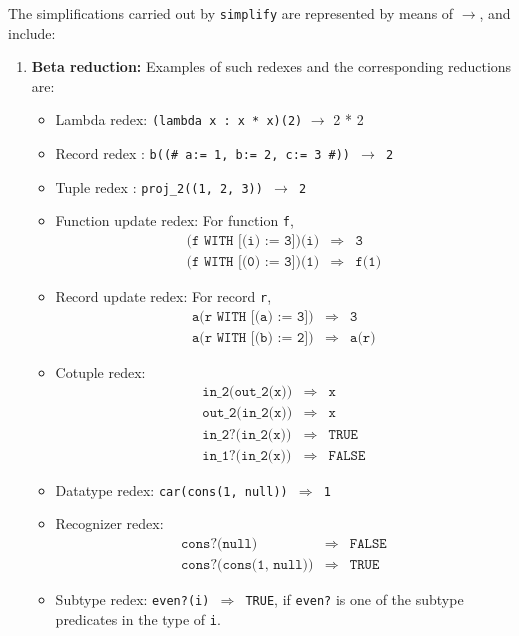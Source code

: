 \documentclass[12pt,twoside]{book}
\makeatletter
\newcommand{\indtt}[1]{\texttt{#1}\index{#1@{\texttt{#1}}}}  %
\makeatother
\begin{document}
\begin{description}
The simplifications carried out by \indtt{simplify} are represented
by means of $\longrightarrow$, and  include:
\begin{enumerate}
\item {\bf Beta reduction:}  Examples of such redexes and the
corresponding reductions are:
\begin{itemize}
\item Lambda redex: \texttt{(lambda x : x * x)(2)} $\longrightarrow$ 2 * 2
\item Record redex : \texttt{b((\# a:= 1, b:= 2, c:= 3 \#)) $\longrightarrow$
2}
\item Tuple redex :   \texttt{proj\_2((1, 2, 3))  $\longrightarrow$ 2}
\item Function update redex: For function \texttt{f},
\begin{eqnarray*}
 \texttt{(f\ WITH\ [(i) := 3])(i)} &\Longrightarrow & \texttt{3}\\
   \texttt{(f\ WITH\ [(0) := 3])(1)} &\Longrightarrow & \texttt{f(1)}
\end{eqnarray*}
\item Record update redex: For record \texttt{r},
\begin{eqnarray*}
\texttt{a(r\ WITH\ [(a) := 3])}  & \Longrightarrow& \texttt{3}\\
\texttt{a(r\ WITH\ [(b) := 2])} & \Longrightarrow & \texttt{a(r)}
\end{eqnarray*}
\item Cotuple redex:
\begin{eqnarray*}
\texttt{in\_2(out\_2(x))} & \Longrightarrow & \texttt{x}\\
\texttt{out\_2(in\_2(x))} & \Longrightarrow & \texttt{x}\\
\texttt{in\_2?(in\_2(x))} & \Longrightarrow & \texttt{TRUE}\\
\texttt{in\_1?(in\_2(x))} & \Longrightarrow & \texttt{FALSE}
\end{eqnarray*}
\item Datatype redex: \texttt{car(cons(1, null)) $\Longrightarrow$ 1}
\item Recognizer redex:
\begin{eqnarray*}
\texttt{cons?(null)} & \Longrightarrow & \texttt{FALSE}\\
\texttt{cons?(cons(1, null))} & \Longrightarrow & \texttt{TRUE}
\end{eqnarray*}
\item Subtype redex:  \texttt{even?(i) $\Longrightarrow$ TRUE}, if \texttt{even?}
is one of the subtype predicates in the type of \texttt{i}.
\end{itemize}


\end{enumerate}
\end{description}
\end{document}
